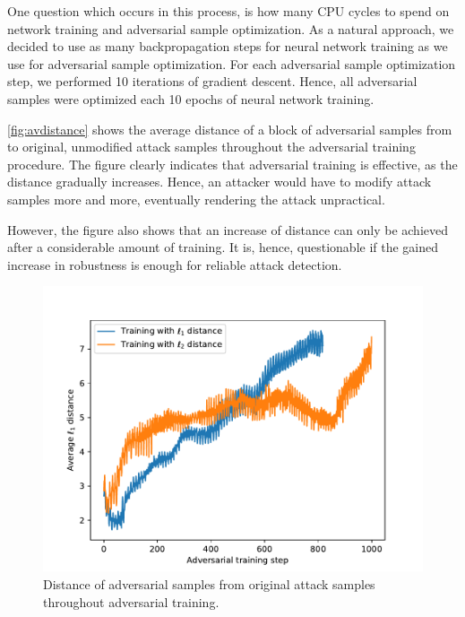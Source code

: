 \documentclass[conference]{IEEEtran}
\begin{document}
One question which occurs in this process, is how many CPU cycles to spend on network training and adversarial sample optimization. As a natural approach, we decided to use as many backpropagation steps for neural network training as we use for adversarial sample optimization.  For each adversarial sample optimization step, we performed 10 iterations of gradient descent. Hence, all adversarial samples were optimized each 10 epochs of neural network training.

\autoref{fig:avdistance} shows the average distance of a block of adversarial samples from to original, unmodified attack samples throughout the adversarial training procedure. The figure clearly indicates that adversarial training is effective, as the distance gradually increases. Hence, an attacker would have to modify attack samples more and more, eventually rendering the attack unpractical.

However, the figure also shows that an increase of distance can only be achieved after a considerable amount of training. It is, hence, questionable if the gained increase in robustness is enough for reliable attack detection.

\begin{figure}
\includegraphics[width=\columnwidth]{../plots/adv_training/avdistance.pdf}
\caption{Distance of adversarial samples from original attack samples throughout adversarial training.}
\label{fig:avdistance}
\end{figure}

\end{document}
